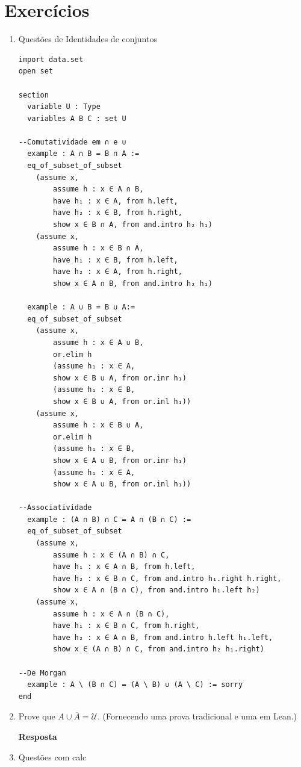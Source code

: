 \section{Exercícios}
\begin{enumerate}
    
\item Questões de Identidades de conjuntos
    
\begin{lstlisting}
import data.set
open set

section
  variable U : Type
  variables A B C : set U

--Comutatividade em ∩ e ∪ 
  example : A ∩ B = B ∩ A := 
  eq_of_subset_of_subset
    (assume x,
        assume h : x ∈ A ∩ B,
        have h₁ : x ∈ A, from h.left,
        have h₂ : x ∈ B, from h.right,
        show x ∈ B ∩ A, from and.intro h₂ h₁)
    (assume x,
        assume h : x ∈ B ∩ A,
        have h₁ : x ∈ B, from h.left,
        have h₂ : x ∈ A, from h.right,
        show x ∈ A ∩ B, from and.intro h₂ h₁)

  example : A ∪ B = B ∪ A:=
  eq_of_subset_of_subset
    (assume x,
        assume h : x ∈ A ∪ B,
        or.elim h
        (assume h₁ : x ∈ A,
        show x ∈ B ∪ A, from or.inr h₁)
        (assume h₁ : x ∈ B,
        show x ∈ B ∪ A, from or.inl h₁))
    (assume x,
        assume h : x ∈ B ∪ A,
        or.elim h
        (assume h₁ : x ∈ B,
        show x ∈ A ∪ B, from or.inr h₁)
        (assume h₁ : x ∈ A,
        show x ∈ A ∪ B, from or.inl h₁))

--Associatividade
  example : (A ∩ B) ∩ C = A ∩ (B ∩ C) :=
  eq_of_subset_of_subset
    (assume x,
        assume h : x ∈ (A ∩ B) ∩ C,
        have h₁ : x ∈ A ∩ B, from h.left,
        have h₂ : x ∈ B ∩ C, from and.intro h₁.right h.right,
        show x ∈ A ∩ (B ∩ C), from and.intro h₁.left h₂) 
    (assume x,
        assume h : x ∈ A ∩ (B ∩ C),
        have h₁ : x ∈ B ∩ C, from h.right,
        have h₂ : x ∈ A ∩ B, from and.intro h.left h₁.left,
        show x ∈ (A ∩ B) ∩ C, from and.intro h₂ h₁.right) 

--De Morgan
  example : A \ (B ∩ C) = (A \ B) ∪ (A \ C) := sorry
end
\end{lstlisting}

\item Prove que $A \cup \overline A = \mathcal U$. (Fornecendo uma prova tradicional e uma em Lean.)

\textbf{Resposta} 




\item Questões com calc
    
    
\end{enumerate}
